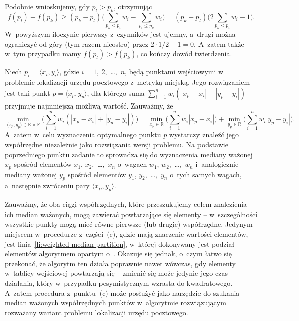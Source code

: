 Podobnie wnioskujemy, gdy $p_l>p_k$, otrzymując
\[
    f(p_l)-f(p_k) \ge (p_k-p_l)\biggl(\sum_{p_k<p_i}w_i-\sum_{p_i\le p_k}w_i\biggr) = (p_k-p_l)\biggl(2\sum_{p_k<p_i}w_i-1\biggr).
\]
W~powyższym iloczynie pierwszy z~czynników jest ujemny, a~drugi można ograniczyć od góry (tym razem nieostro) przez $2\cdot1/2-1=0$. A~zatem także w~tym przypadku mamy $f(p_l)>f(p_k)$, co kończy dowód twierdzenia.

\subproblem %
Niech $p_i=\langle x_i,y_i\rangle$, gdzie $i=1$, 2,~\dots,~$n$, będą punktami wejściowymi w~ problemie lokalizacji urzędu pocztowego z~metryką miejską. Jego rozwiązaniem jest taki punkt $p=\langle x_p,y_p\rangle$, dla którego suma $\sum_{i=1}^nw_i(|x_p-x_i|+|y_p-y_i|)$ przyjmuje najmniejszą możliwą wartość. Zauważmy, że
\[
    \min_{\langle x_p,y_p\rangle\in\mathbb{R}\times\mathbb{R}}\biggl(\sum_{i=1}^nw_i(|x_p-x_i|+|y_p-y_i|)\biggr) = \min_{x_p\in\mathbb{R}}\biggl(\sum_{i=1}^nw_i|x_p-x_i|\biggr)+\min_{y_p\in\mathbb{R}}\biggl(\sum_{i=1}^nw_i|y_p-y_i|\biggr).
\]
A~zatem w~celu wyznaczenia optymalnego punktu $p$ wystarczy znaleźć jego współrzędne niezależnie jako rozwiązania  wersji problemu. Na podstawie poprzedniego punktu zadanie to sprowadza się do wyznaczenia mediany ważonej $x_p$ spośród elementów $x_1$, $x_2$,~\dots,~$x_n$ o~wagach $w_1$, $w_2$,~\dots,~$w_n$ i~analogicznie mediany ważonej $y_p$ spośród elementów $y_1$, $y_2$,~\dots,~$y_n$ o~tych samych wagach, a~następnie zwróceniu pary $\langle x_p,y_p\rangle$.

Zauważmy, że oba ciągi współrzędnych, które przeszukujemy celem znalezienia ich median ważonych, mogą zawierać powtarzające się elementy -- w~szczególności wszystkie punkty mogą mieć równe pierwsze (lub drugie) współrzędne. Jedynym miejscem w~procedurze  z~części~(c), gdzie mają znaczenie wartości elementów, jest linia~\ref{li:weighted-median-partition}, w~której dokonywany jest podział elementów algorytmem opartym o~. Okazuje się jednak, o~czym łatwo się przekonać, że algorytm ten działa poprawnie nawet wówczas, gdy elementy w~tablicy wejściowej powtarzają się -- zmienić się może jedynie jego czas działania, który w~przypadku pesymistycznym wzrasta do kwadratowego. A~zatem procedura z~punktu~(c) może posłużyć jako narzędzie do szukania median ważonych współrzędnych punktów w~algorytmie rozwiązującym rozważany wariant problemu lokalizacji urzędu pocztowego.


